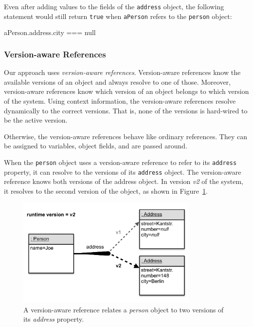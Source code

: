 Even after adding values to the fields of the \lstinline{address} object, the following statement would still return \lstinline{true} when \lstinline{aPerson} refers to the \lstinline{person} object:

\begin{code}{}{}
aPerson.address.city === null
\end{code}
\iffalse
\end{verbatim}\fi


\subsubsection{Version-aware References}

Our approach uses \emph{version-aware references}.
Version-aware references know the available versions of an object and always resolve to one of those.
Moreover, version-aware references know which version of an object belongs to which version of the system.
Using context information, the version-aware references resolve dynamically to the correct versions.
That is, none of the versions is hard-wired to be the active version.

Otherwise, the version-aware references behave like ordinary references.
They can be assigned to variables, object fields, and are passed around.

When the \lstinline{person} object uses a version-aware reference to refer to its \lstinline{address} property, it can resolve to the versions of its \lstinline{address} object.
The version-aware reference knows both versions of the address object.
In version \emph{v2} of the system, it resolves to the second version of the object, as shown in Figure~\ref{fig:VersionAwareReferenceFollowingVersion2}.

\begin{figure}[h]
    \centering
    \includegraphics[width=0.8\textwidth]{figures/4_approach/5_versionAwareReferenceFollowingVersion2.pdf}
    \caption{A version-aware reference relates a \emph{person} object to two versions of its \emph{address} property.}
    \label{fig:VersionAwareReferenceFollowingVersion2}
\end{figure}

